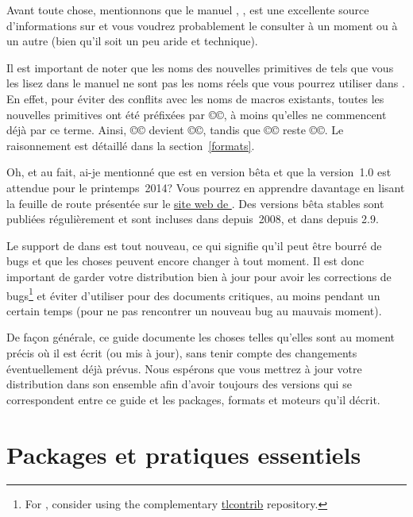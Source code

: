 \documentclass{lltxdoc}
\begin{document}
Avant toute chose, mentionnons que le manuel \luatex, ,
est une excellente source d'informations sur \luatex et vous voudrez probablement
le consulter à un moment ou à un autre (bien qu'il soit un peu aride et technique).

Il est important de noter que les noms des nouvelles primitives de \luatex tels
que vous les lisez dans le manuel ne sont pas les noms réels que vous pourrez
utiliser dans \lualatex. En effet, pour éviter des conflits avec les noms de macros
existants, toutes les nouvelles primitives ont été préfixées par ©\luatex©,
à moins qu'elles ne commencent déjà par ce terme. Ainsi, ©\luaescapestring©
devient ©\luatexluaescapetring©, tandis que ©\luatexversion© reste ©\luatexversion©.
Le raisonnement est détaillé dans la section~\ref{formats}.

\medskip

Oh, et au fait, ai-je mentionné que \luatex est en version bêta et que
la version~1.0 est attendue pour le printemps~2014? Vous pourrez en apprendre
davantage en lisant la feuille de route présentée sur le
\href{http://luatex.org/}{site web de \luatex}. Des versions bêta stables
sont publiées régulièrement et sont incluses dans \texlive depuis~2008,
et dans \miktex depuis 2.9.

Le support de \luatex dans \latex est tout nouveau, ce qui signifie qu'il peut
être bourré de bugs et que les choses peuvent encore changer à tout moment.
Il est donc important de garder votre distribution \tex bien à jour pour avoir
les corrections de bugs\footnote{For \texlive, consider using the complementary
  \href{http://tlcontrib.metatex.org/}{tlcontrib} repository.} et éviter
d'utiliser \lualatex pour des documents critiques, au moins pendant un certain temps
(pour ne pas rencontrer un nouveau bug au mauvais moment).

De façon générale, ce guide documente les choses telles qu'elles sont au moment
précis où il est écrit (ou mis à jour), sans tenir compte des changements
éventuellement déjà prévus. Nous espérons que vous mettrez à jour votre
distribution dans son ensemble afin d'avoir toujours des versions
qui se correspondent entre ce guide et les packages, formats et moteurs
qu'il décrit.


\section{Packages et pratiques essentiels}\label{essential}
\end{document}
